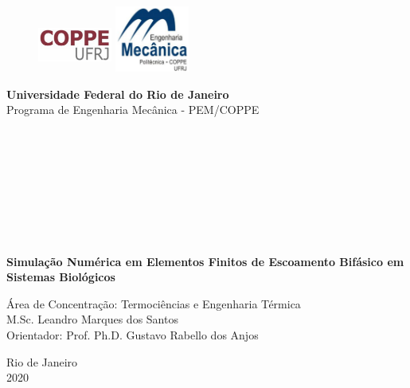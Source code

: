 \begin{titlepage}
\begin{center}


  \begin{figure}[hbt!]
		          \includegraphics[width=2.44cm,height=1.8cm]{figure/coppe.png}
		   \hfill \includegraphics[width=2.44cm,height=2.17cm]{figure/pem.png}
  \end{figure}



  \vspace{-2cm}
  \hspace{0cm}\large{\textbf{Universidade Federal do Rio de Janeiro}}\\
  \hspace{0cm}\large{Programa de Engenharia Mecânica - PEM/COPPE}\\

  \hspace{2cm}\large{}\\
  \hspace{2cm}\large{}\\
  \hspace{2cm}\large{}\\
  \hspace{2cm}\large{}\\

  \hspace{2cm}\large{}\\
  \hspace{2cm}\large{}\\
  \hspace{2cm}\large{}\\
  \hspace{2cm}\large{}\\


  \par
  \vspace{1cm}
  \textbf{\LARGE Simulação Numérica em Elementos Finitos de Escoamento Bifásico em Sistemas Biológicos }

  \par
  \vspace{0.5cm}
  {Área de Concentração: Termociências e Engenharia Térmica}\\
  \vspace{0.5cm}
  {M.Sc. Leandro Marques dos Santos}\\
  \vspace{0.3cm}
  {Orientador: Prof. Ph.D. Gustavo Rabello dos Anjos}



  \par\vfill
  {\large Rio de Janeiro\\2020}

\end{center}
\end{titlepage}
